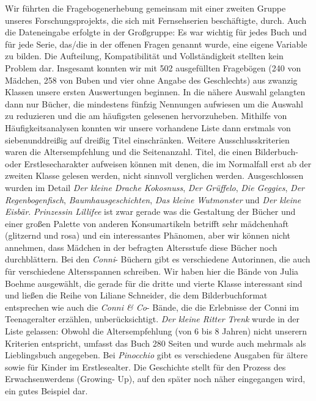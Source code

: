 Wir führten die Fragebogenerhebung gemeinsam mit einer zweiten Gruppe
unseres Forschungsprojekts, die sich mit Fernsehserien beschäftigte,
durch. Auch die Dateneingabe erfolgte in der Großgruppe: Es war wichtig
für jedes Buch und für jede Serie, das/die in der offenen Fragen genannt
wurde, eine eigene Variable zu bilden. Die Aufteilung, Kompatibilität
und Vollständigkeit stellten kein Problem dar. Insgesamt konnten wir mit
502 ausgefüllten Fragebögen (240 von Mädchen, 258 von Buben und vier
ohne Angabe des Geschlechts) aus zwanzig Klassen unsere ersten
Auswertungen beginnen. In die nähere Auswahl gelangten dann nur Bücher,
die mindestens fünfzig Nennungen aufwiesen um die Auswahl zu reduzieren
und die am häufigsten gelesenen hervorzuheben. Mithilfe von
Häufigkeitsanalysen konnten wir unsere vorhandene Liste dann erstmals
von siebenunddreißig auf dreißig Titel einschränken. Weitere
Ausschlusskriterien waren die Altersempfehlung und die Seitenanzahl.
Titel, die einen Bilderbuch- oder Erstlesecharakter aufweisen können mit
denen, die im Normalfall erst ab der zweiten Klasse gelesen werden,
nicht sinnvoll verglichen werden. Ausgeschlossen wurden im Detail
\emph{Der kleine Drache Kokosnuss}, \emph{Der Grüffelo}, \emph{Die
Geggies}, \emph{Der Regenbogenfisch}, \emph{Baumhausgeschichten},
\emph{Das kleine Wutmonster} und \emph{Der kleine Eisbär}.
\emph{Prinzessin Lillifee} ist zwar gerade was die Gestaltung der Bücher
und einer großen Palette von anderen Konsumartikeln betrifft sehr
mädchenhaft (glitzernd und rosa) und ein interessantes Phänomen, aber
wir können nicht annehmen, dass Mädchen in der befragten Altersstufe
diese Bücher noch durchblättern. Bei den \emph{Conni}- Büchern gibt es
verschiedene Autorinnen, die auch für verschiedene Altersspannen
schreiben. Wir haben hier die Bände von Julia Boehme ausgewählt, die
gerade für die dritte und vierte Klasse interessant sind und ließen die
Reihe von Liliane Schneider, die dem Bilderbuchformat entsprechen wie
auch die \emph{Conni \& Co}- Bände, die die Erlebnisse der Conni im
Teenageralter erzählen, unberücksichtigt. \emph{Der kleine Ritter Trenk}
wurde in der Liste gelassen: Obwohl die Altersempfehlung (von 6 bis 8
Jahren) nicht unserern Kriterien entspricht, umfasst das Buch 280 Seiten
und wurde auch mehrmals als Lieblingsbuch angegeben. Bei
\emph{Pinocchio} gibt es verschiedene Ausgaben für ältere sowie für
Kinder im Erstlesealter. Die Geschichte stellt für den Prozess des
Erwachsenwerdens (Growing- Up), auf den später noch näher eingegangen
wird, ein gutes Beispiel dar.

